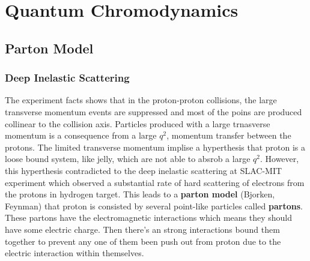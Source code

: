 \section{Quantum Chromodynamics}

\subsection{Parton Model}

\subsubsection{Deep Inelastic Scattering}
The experiment facts shows that in the proton-proton collisions, the large transverse momentum events are suppressed and most of the poins are produced collinear to the collision axis. Particles produced with a large trnasverse momentum is a consequence from a large $q^2$, momentum transfer between the protons. The limited transverse momentum implise a hyperthesis that proton is a loose bound system, like jelly, which are not able to absrob a large $q^2$. However, this hyperthesis contradicted to the deep inelastic scattering at SLAC-MIT experiment which observed a substantial rate of hard scattering of electrons from the protons in hydrogen target. This leads to a \textbf{parton model} (Bjorken, Feynman) that proton is consisted by several point-like particles called \textbf{partons}. These partons have the electromagnetic interactions which means they should have some electric charge. Then there's an strong interactions bound them together to prevent any one of them been push out from proton due to the electric interaction within themselves. 


